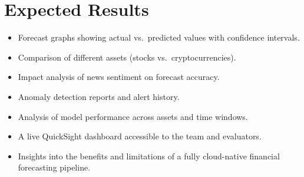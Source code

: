 \documentclass[a4paper,12pt]{article}
\begin{document}
\section{Expected Results}
\begin{itemize}[leftmargin=1.2em]
    \item Forecast graphs showing actual vs.\ predicted values with confidence intervals.
    \item Comparison of different assets (stocks vs.\ cryptocurrencies).
    \item Impact analysis of news sentiment on forecast accuracy.
    \item Anomaly detection reports and alert history.
    \item Analysis of model performance across assets and time windows.
    \item A live QuickSight dashboard accessible to the team and evaluators.
    \item Insights into the benefits and limitations of a fully cloud-native financial forecasting pipeline.
\end{itemize}
\end{document}
